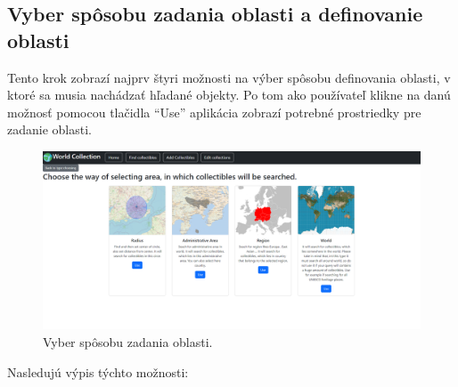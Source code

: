 \subsection*{Vyber spôsobu zadania oblasti a definovanie oblasti}
Tento krok zobrazí najprv štyri možnosti na výber spôsobu definovania oblasti, v ktoré sa musia nachádzať hľadané objekty. Po tom ako používateľ klikne na danú možnosť pomocou tlačidla “Use” aplikácia zobrazí potrebné prostriedky pre zadanie oblasti.
\begin{figure}[h]
      \includegraphics[width=140mm]{../img/ud-vyber-oblasti.png}
      \centering
      \caption{Vyber spôsobu zadania oblasti.}
\end{figure}
Nasledujú výpis týchto možnosti:
